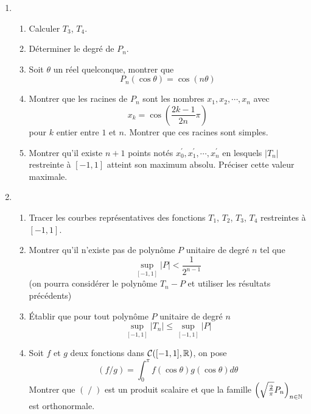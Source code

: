 \begin{enumerate}
 \item 
\begin{enumerate}
 \item Calculer $T_3$, $T_4$.
\item Déterminer le degré de $P_n$.
\item Soit $\theta$ un réel quelconque, montrer que 
\begin{displaymath}
 P_n(\cos \theta)=\cos(n \theta)
\end{displaymath}
 \item Montrer que les racines de $P_n$ sont les nombres $x_1, x_2, \cdots , x_n$ avec
\begin{displaymath}
 x_k = \cos \left( \frac{2k-1}{2n}\pi\right) 
\end{displaymath}
pour $k$ entier entre $1$ et $n$. Montrer que ces racines sont simples.
\item Montrer qu'il existe $n+1$ points notés $x^\prime_0, x^\prime_1, \cdots ,x^\prime_n$ en lesquels $|T_n|$ restreinte à $[-1,1]$ atteint son maximum absolu. Préciser cette valeur maximale.
\end{enumerate}

\item \begin{enumerate}
 \item Tracer les courbes représentatives des fonctions $T_1$, $T_2$, $T_3$, $T_4$ restreintes à $[-1,1]$.
\item Montrer qu'il n'existe pas de polynôme $P$ unitaire de degré $n$ tel que
\begin{displaymath}
 \sup_{[-1,1]}|P| < \frac{1}{2^{n-1}}
\end{displaymath}
 (on pourra considérer le polynôme $T_n - P$ et utiliser les résultats précédents)

\item \'Etablir que pour tout polynôme $P$ unitaire de degré $n$
\begin{displaymath}
 \sup_{[-1,1]}|T_n| \leq \sup_{[-1,1]}|P| 
\end{displaymath}
\item Soit $f$ et $g$ deux fonctions dans $\mathcal{C}([-1,1],\mathbb{R})$, on pose
\begin{displaymath}
 (f/g) = \int_0^\pi f(\cos \theta) g(\cos \theta) d\theta
\end{displaymath}
Montrer que $( \;/\;)$ est un produit scalaire et que la famille $\left(\sqrt{\frac{2}{\pi}}P_n \right)_{n\in\mathbb{N}}$ est orthonormale.
\end{enumerate}
\end{enumerate}

